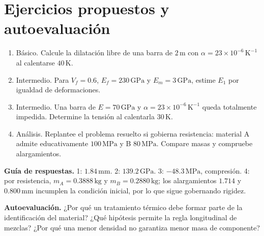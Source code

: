 \section{Ejercicios propuestos y autoevaluación}
\begin{enumerate}
\item Básico. Calcule la dilatación libre de una barra de $2\,\mathrm{m}$ con $\alpha=23\times10^{-6}\,\mathrm{K^{-1}}$ al calentarse $40\,\mathrm{K}$.
\item Intermedio. Para $V_f=0.6$, $E_f=230\,\mathrm{GPa}$ y $E_m=3\,\mathrm{GPa}$, estime $E_1$ por igualdad de deformaciones.
\item Intermedio. Una barra de $E=70\,\mathrm{GPa}$ y $\alpha=23\times10^{-6}\,\mathrm{K^{-1}}$ queda totalmente impedida. Determine la tensión al calentarla $30\,\mathrm{K}$.
\item Análisis. Replantee el problema resuelto si gobierna resistencia: material A admite educativamente $100\,\mathrm{MPa}$ y B $80\,\mathrm{MPa}$. Compare masas y compruebe alargamientos.
\end{enumerate}
\textbf{Guía de respuestas.} 1: $1.84\,\mathrm{mm}$. 2: $139.2\,\mathrm{GPa}$. 3: $-48.3\,\mathrm{MPa}$, compresión. 4: por resistencia, $m_A=0.3888\,\mathrm{kg}$ y $m_B=0.2880\,\mathrm{kg}$; los alargamientos $1.714$ y $0.800\,\mathrm{mm}$ incumplen la condición inicial, por lo que sigue gobernando rigidez.

\textbf{Autoevaluación.} ¿Por qué un tratamiento térmico debe formar parte de la identificación del material? ¿Qué hipótesis permite la regla longitudinal de mezclas? ¿Por qué una menor densidad no garantiza menor masa de componente?


\studiumchaptercheck
